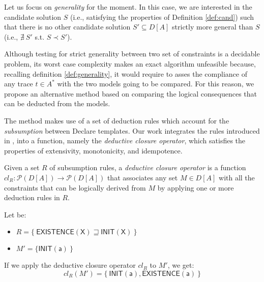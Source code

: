 
Let us focus on \emph{generality} for the moment. In this case, we are interested in the candidate solution $S$ (i.e., satisfying the properties of Definition \ref{def:cand}) such that there is no other candidate solution $S'\subseteq D[A]$  strictly more general than $S$ (i.e., $\nexists~ S'$ s.t. $S\prec S'$).


Although testing for strict generality between two set of constraints is a decidable problem, its worst case complexity makes an exact algorithm unfeasible because, recalling definition \ref{def:generality}, it would require to asses the compliance of any trace $t \in A^*$ with the two models going to be compared.
For this reason, we propose an alternative method based on comparing the logical consequences that can be deducted from the models.

The method makes use of a set of deduction rules which account for the \emph{subsumption} between Declare templates. Our work integrates the rules introduced in \cite{2017-DiCiccio}, into a function, namely the \emph{deductive closure operator}, which satisfies the properties of extensivity, monotonicity, and idempotence.


\theoremstyle{definition}\label{def:closure}
\begin{definition}{}
Given a set $R$ of subsumption rules, a \emph{deductive closure operator} is a function $cl_R: \mathcal{P}(D[A])\rightarrow\mathcal{P}(D[A])$ that associates any set $M \in D[A]$ with all the constraints that can be logically derived from $M$ by applying one or more deduction rules in $R$.
\end{definition}

\begin{example}
Let be:
\begin{itemize}
\item $R=\{\ \mathsf{EXISTENCE(X)} \sqsupseteq \mathsf{INIT(X)}\ \}$
\item $M'=\{ \mathsf{INIT(a)}\ \}$
\end{itemize}
If we apply the deductive closure operator $cl_R$ to $M'$, we get:
$$
cl_R(M') = \{\ \mathsf{INIT(a), EXISTENCE(a)}\ \}
$$
\end{example}

